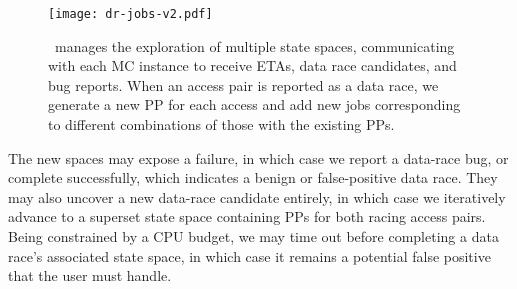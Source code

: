 \begin{figure}[t]
	\texttt{[image: dr-jobs-v2.pdf]}
	\caption{\quicksand~manages the exploration of multiple state spaces, communicating with each MC instance to receive ETAs, data race candidates, and bug reports.
		When an access pair is reported as a data race, we generate a new PP for each access and add new jobs corresponding to different combinations of those with the existing PPs.}
	\label{fig:new-dr-jobs}
\end{figure}

The new spaces may expose a failure, in which case we report a data-race bug,
or complete successfully, which indicates a benign or false-positive data race.
They may also uncover a new data-race candidate entirely, %
in which case we iteratively advance to a superset state space containing PPs for both racing access pairs.
Being constrained by a CPU budget,
we may time out before completing a data race's associated state space,
in which case it remains a potential false positive that the user must handle.



